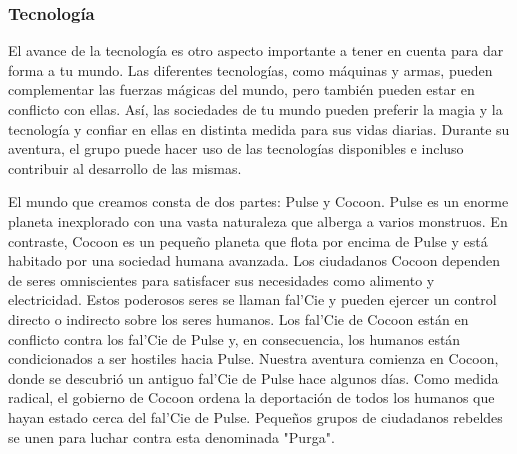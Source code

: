 \subsubsection*{Tecnología}
El avance de la tecnología es otro aspecto importante a tener en cuenta para dar forma a tu mundo. Las diferentes tecnologías, como máquinas y armas, pueden complementar las fuerzas mágicas del mundo, pero también pueden estar en conflicto con ellas. Así, las sociedades de tu mundo pueden preferir la magia y la tecnología y confiar en ellas en distinta medida para sus vidas diarias. Durante su aventura, el grupo puede hacer uso de las tecnologías disponibles e incluso contribuir al desarrollo de las mismas.

\vspace{0.8cm}

{
 El mundo que creamos consta de dos partes: Pulse y Cocoon. Pulse es un enorme planeta inexplorado con una vasta naturaleza que alberga a varios monstruos. En contraste, Cocoon es un pequeño planeta que flota por encima de Pulse y está habitado por una sociedad humana avanzada. Los ciudadanos Cocoon dependen de seres omniscientes para satisfacer sus necesidades como alimento y electricidad. Estos poderosos seres se llaman fal’Cie y pueden ejercer un control directo o indirecto sobre los seres humanos. Los fal’Cie de Cocoon están en conflicto contra los fal’Cie de Pulse y, en consecuencia, los humanos están condicionados a ser hostiles hacia Pulse. Nuestra aventura comienza en Cocoon, donde se descubrió un antiguo fal’Cie de Pulse hace algunos días. Como medida radical, el gobierno de Cocoon ordena la deportación de todos los humanos que hayan estado cerca del fal’Cie de Pulse. Pequeños grupos de ciudadanos rebeldes se unen para luchar contra esta denominada "Purga".
}

\pagebreak






